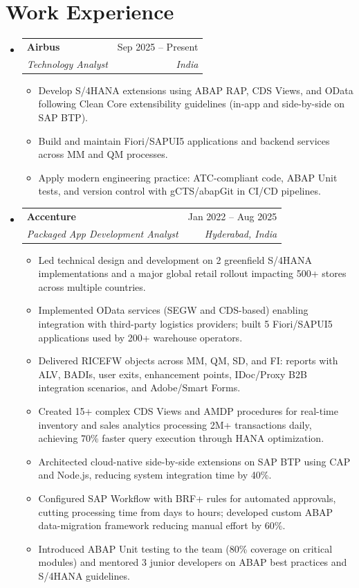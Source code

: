 \documentclass[letterpaper,11pt]{article}
\makeatletter
\newcommand{\resumeItem}[1]{
  \item\small{
    {#1 \vspace{-2pt}}
  }
}
\newcommand{\resumeSubheading}[4]{
  \vspace{-2pt}\item
    \begin{tabular*}{0.97\textwidth}[t]{l@{\extracolsep{\fill}}r}
      \textbf{#1} & #2 \\
      \textit{\small#3} & \textit{\small #4} \\
    \end{tabular*}\vspace{-7pt}
}
\newcommand{\resumeSubHeadingListStart}{\begin{itemize}[leftmargin=0.15in, label={}]}
\newcommand{\resumeSubHeadingListEnd}{\end{itemize}}
\newcommand{\resumeItemListStart}{\begin{itemize}}
\newcommand{\resumeItemListEnd}{\end{itemize}\vspace{-5pt}}
\makeatother
\begin{document}
\section{Work Experience}
  \resumeSubHeadingListStart

    \resumeSubheading
      {Airbus}{Sep 2025 -- Present}
      {Technology Analyst}{India}
      \resumeItemListStart
        \resumeItem{Develop S/4HANA extensions using ABAP RAP, CDS Views, and OData following Clean Core extensibility guidelines (in-app and side-by-side on SAP BTP).}
        \resumeItem{Build and maintain Fiori/SAPUI5 applications and backend services across MM and QM processes.}
        \resumeItem{Apply modern engineering practice: ATC-compliant code, ABAP Unit tests, and version control with gCTS/abapGit in CI/CD pipelines.}
      \resumeItemListEnd

    \resumeSubheading
      {Accenture}{Jan 2022 -- Aug 2025}
      {Packaged App Development Analyst}{Hyderabad, India}
      \resumeItemListStart
        \resumeItem{Led technical design and development on 2 greenfield S/4HANA implementations and a major global retail rollout impacting 500+ stores across multiple countries.}
        \resumeItem{Implemented OData services (SEGW and CDS-based) enabling integration with third-party logistics providers; built 5 Fiori/SAPUI5 applications used by 200+ warehouse operators.}
        \resumeItem{Delivered RICEFW objects across MM, QM, SD, and FI: reports with ALV, BADIs, user exits, enhancement points, IDoc/Proxy B2B integration scenarios, and Adobe/Smart Forms.}
        \resumeItem{Created 15+ complex CDS Views and AMDP procedures for real-time inventory and sales analytics processing 2M+ transactions daily, achieving 70\% faster query execution through HANA optimization.}
        \resumeItem{Architected cloud-native side-by-side extensions on SAP BTP using CAP and Node.js, reducing system integration time by 40\%.}
        \resumeItem{Configured SAP Workflow with BRF+ rules for automated approvals, cutting processing time from days to hours; developed custom ABAP data-migration framework reducing manual effort by 60\%.}
        \resumeItem{Introduced ABAP Unit testing to the team (80\% coverage on critical modules) and mentored 3 junior developers on ABAP best practices and S/4HANA guidelines.}

      \resumeItemListEnd

  \resumeSubHeadingListEnd

\end{document}
